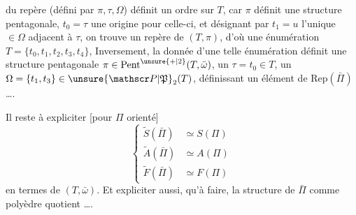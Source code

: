 du repère (défini par $\pi,\tau,\Omega$) définit un ordre sur $T$, car $\pi$ définit une structure pentagonale, $t_0=\tau$ une origine pour celle-ci, et désignant par $t_1=u$ l'unique $\in\Omega$ adjacent à $\tau$, on trouve un repère de  $(T,\pi)$, d'où une énumération $T=\{t_0,t_1,t_2,t_3,t_4\}$,  Inversement, la donnée d'une telle énumération définit une structure pentagonale $\pi\in\mathrm{Pent}^{\unsure{+|2}}(T,\bar\omega)$,  un $\tau=t_0\in T$, un $\Omega=\{t_1,t_3\}\in\unsure{\mathscr P|\mathfrak P}_2(T)$, définissant un élément de $\mathrm{Rep}(\bar\Pi)$ \ldots.


Il reste à expliciter [pour $\Pi$ orienté]
\[
\left\{\begin{aligned}
\widetilde{S}(\bar\Pi)&\simeq S(\Pi)\\
\widetilde A(\bar\Pi)&\simeq A(\Pi)\\
\widetilde F(\bar\Pi)&\simeq F(\Pi)
\end{aligned}\right.
\]
en termes de $(T,\bar\omega)$. Et expliciter aussi,  qu'à faire, la structure de $\bar\Pi$ comme polyèdre quotient \ldots.

